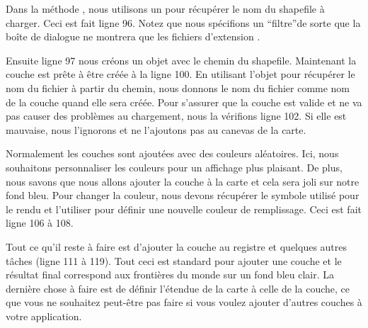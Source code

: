 Dans la méthode , nous utilisons un  pour récupérer le nom du shapefile à charger. Ceci est fait ligne 96. Notez que nous spécifions un ``filtre''de sorte que la boîte de dialogue ne montrera que les fichiers d'extension .

Ensuite ligne 97 nous créons un objet  avec le chemin du shapefile. Maintenant la couche est prête à être créée à la ligne 100. En utilisant l'objet  pour récupérer le nom du fichier à partir du chemin, nous donnons le nom du fichier comme nom de la couche quand elle sera créée. Pour s'assurer que la couche est valide et ne va pas causer des problèmes au chargement, nous la vérifions ligne 102. Si elle est mauvaise, nous l'ignorons et ne l'ajoutons pas au canevas de la carte.

Normalement les couches sont ajoutées avec des couleurs aléatoires. Ici, nous souhaitons personnaliser les couleurs pour un affichage plus plaisant. De plus, nous savons que nous allons ajouter la couche  à la carte et cela sera joli sur notre fond bleu. Pour changer la couleur, nous devons récupérer le symbole utilisé pour le rendu et l'utiliser pour définir une nouvelle couleur de remplissage. Ceci est fait ligne 106 à 108.

Tout ce qu'il reste à faire est d'ajouter la couche au registre et quelques autres tâches (ligne 111 à 119). Tout ceci est standard pour ajouter une couche et le résultat final correspond aux frontières du monde sur un fond bleu clair. La dernière chose à faire est de définir l'étendue de la carte à celle de la couche, ce que vous ne souhaitez peut-être pas faire si vous voulez ajouter d'autres couches à votre application.

